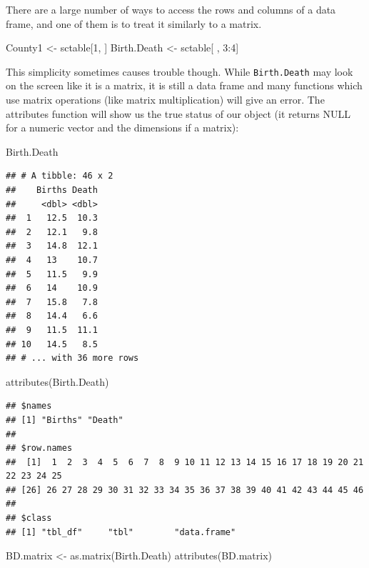 \documentclass[
]{book}
\newenvironment{Shaded}{\begin{snugshade}}{\end{snugshade}}
\newcommand{\DecValTok}[1]{\textcolor[rgb]{0.00,0.00,0.81}{#1}}
\newcommand{\FunctionTok}[1]{\textcolor[rgb]{0.00,0.00,0.00}{#1}}
\newcommand{\NormalTok}[1]{#1}
\newcommand{\OtherTok}[1]{\textcolor[rgb]{0.56,0.35,0.01}{#1}}
\newcommand{\SpecialCharTok}[1]{\textcolor[rgb]{0.00,0.00,0.00}{#1}}
\begin{document}
There are a large number of ways to access the rows and columns of a data frame, and one of them is to treat it similarly to a matrix.

\begin{Shaded}
\begin{Highlighting}[]
\NormalTok{County1 }\OtherTok{\textless{}{-}}\NormalTok{ sctable[}\DecValTok{1}\NormalTok{, ]}
\NormalTok{Birth.Death }\OtherTok{\textless{}{-}}\NormalTok{ sctable[ , }\DecValTok{3}\SpecialCharTok{:}\DecValTok{4}\NormalTok{]}
\end{Highlighting}
\end{Shaded}

This simplicity sometimes causes trouble though. While \texttt{Birth.Death} may look on the screen like it is a matrix, it is still a data frame and many functions which use matrix operations (like matrix multiplication) will give an error. The attributes function will show us the true status of our object (it returns NULL for a numeric vector and the dimensions if a matrix):

\begin{Shaded}
\begin{Highlighting}[]
\NormalTok{Birth.Death}
\end{Highlighting}
\end{Shaded}

\begin{verbatim}
## # A tibble: 46 x 2
##    Births Death
##     <dbl> <dbl>
##  1   12.5  10.3
##  2   12.1   9.8
##  3   14.8  12.1
##  4   13    10.7
##  5   11.5   9.9
##  6   14    10.9
##  7   15.8   7.8
##  8   14.4   6.6
##  9   11.5  11.1
## 10   14.5   8.5
## # ... with 36 more rows
\end{verbatim}

\begin{Shaded}
\begin{Highlighting}[]
\FunctionTok{attributes}\NormalTok{(Birth.Death)}
\end{Highlighting}
\end{Shaded}

\begin{verbatim}
## $names
## [1] "Births" "Death" 
## 
## $row.names
##  [1]  1  2  3  4  5  6  7  8  9 10 11 12 13 14 15 16 17 18 19 20 21 22 23 24 25
## [26] 26 27 28 29 30 31 32 33 34 35 36 37 38 39 40 41 42 43 44 45 46
## 
## $class
## [1] "tbl_df"     "tbl"        "data.frame"
\end{verbatim}

\begin{Shaded}
\begin{Highlighting}[]
\NormalTok{BD.matrix }\OtherTok{\textless{}{-}} \FunctionTok{as.matrix}\NormalTok{(Birth.Death)}
\FunctionTok{attributes}\NormalTok{(BD.matrix)}
\end{Highlighting}
\end{Shaded}
\end{document}
